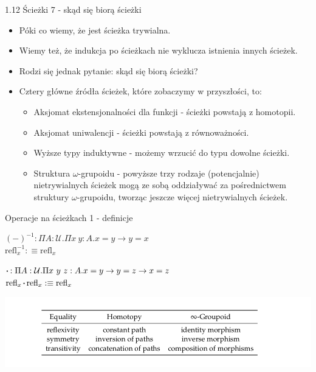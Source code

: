 \documentclass{beamer}
\newcommand{\defn}{:\equiv}
\newcommand{\U}{\mathcal{U}}
\newcommand{\refl}[1]{\text{refl}_{#1}}
\newcommand{\inv}[1]{#1^{-1}}
\newcommand{\sq}{\mathbin{\vcenter{\hbox{\rule{.3ex}{.3ex}}}}}
\begin{document}
\begin{frame}{1.12 Ścieżki 7 - skąd się biorą ścieżki}
\begin{itemize}
	\item Póki co wiemy, że jest ścieżka trywialna.
	\item Wiemy też, że indukcja po ścieżkach nie wyklucza istnienia innych ścieżek.
	\item Rodzi się jednak pytanie: skąd się biorą ścieżki?
	\item Cztery główne źródła ścieżek, które zobaczymy w przyszłości, to:
	\begin{itemize}
		\item Aksjomat ekstensjonalności dla funkcji - ścieżki powstają z homotopii.
		\item Aksjomat uniwalencji - ścieżki powstają z równoważności.
		\item Wyższe typy induktywne - możemy wrzucić do typu dowolne ścieżki.
		\item Struktura $\omega$-grupoidu - powyższe trzy rodzaje (potencjalnie) nietrywialnych ścieżek mogą ze sobą oddziaływać za pośrednictwem struktury $\omega$-grupoidu, tworząc jeszcze więcej nietrywialnych ścieżek. 
	\end{itemize}
\end{itemize}
\end{frame}

\begin{frame}{Operacje na ścieżkach 1 - definicje}

\begin{definition}
$\inv{(-)} : \Pi A : \U. \Pi x\ y : A. x = y \to y = x$ \\
$\inv{\refl{x}} \defn \refl{x}$
\end{definition}

\begin{definition}
$\sq : \Pi A : \U. \Pi x\ y\ z : A. x = y \to y = z \to x = z$ \\
$\refl{x} \sq \refl{x} \defn \refl{x}$
\end{definition}

\includegraphics[scale=0.3]{EqPathGrupoid.png}

\end{frame}
\end{document}
